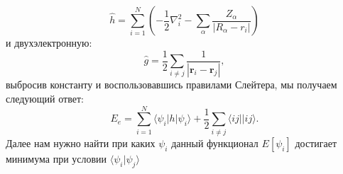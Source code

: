 \documentclass[12pt, oneside]{article}
\numberwithin{equation}{section}  %
\begin{document}
\begin{equation}
\hat{h} = \sum_{i=1}^{N} \left(- \dfrac{1}{2} \nabla_i^2 - \sum_\alpha \dfrac{Z_\alpha}{|R_\alpha - r_i|}\right)
\end{equation}
и двухэлектронную:
\begin{equation}
\hat{g} = \dfrac{1}{2} \sum_{i \neq j} \dfrac{1}{|\bm{r}_i - \bm{r}_j|},
\end{equation}
выбросив константу и воспользовавшись правилами Слейтера, мы получаем следующий ответ:
\begin{equation}
E_e = \sum_{i=1}^N \langle \psi_i | h | \psi_i \rangle + \dfrac{1}{2} \sum_{i \neq j} \langle ij || ij \rangle .
\end{equation}
Далее нам нужно найти при каких \(\psi_i\) данный функционал \(E[\psi_i]\) достигает минимума при условии \(\langle \psi_i | \psi_j \rangle \)
\end{document}
